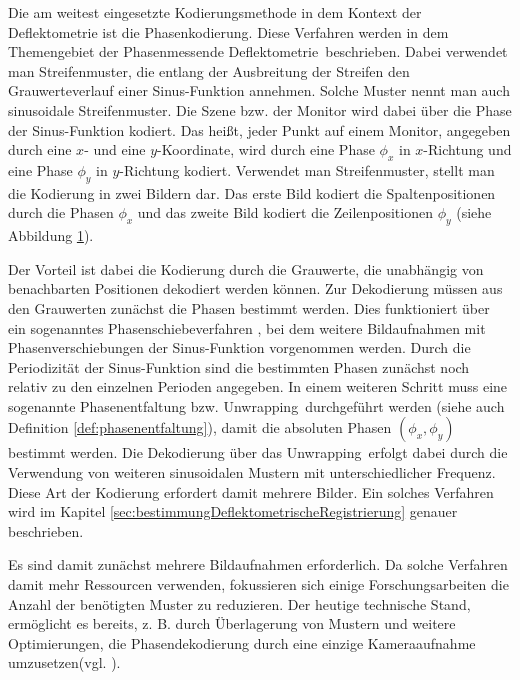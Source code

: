 Die am weitest eingesetzte Kodierungsmethode in dem Kontext der Deflektometrie ist die Phasenkodierung.
Diese Verfahren werden in dem Themengebiet der \glqq Phasenmessende Deflektometrie\grqq ~beschrieben.
Dabei verwendet man Streifenmuster, die entlang der Ausbreitung der Streifen den Grauwerteverlauf einer Sinus-Funktion annehmen.
Solche Muster nennt man auch sinusoidale Streifenmuster.
Die Szene bzw. der Monitor wird dabei über die Phase der Sinus-Funktion kodiert.
Das heißt, jeder Punkt auf einem Monitor, angegeben durch eine $x$- und eine $y$-Koordinate, wird durch eine Phase $\phi_x$ in $x$-Richtung und eine Phase $\phi_y$ in $y$-Richtung kodiert.
Verwendet man Streifenmuster, stellt man die Kodierung in zwei Bildern dar.
Das erste Bild kodiert die Spaltenpositionen durch die Phasen $\phi_x$ und das zweite Bild kodiert die Zeilenpositionen $\phi_y$ (siehe Abbildung \ref{tikz:abbSinusoidaleStreifenmuster}).

\begin{figure}[H]
	\centering
		
		\label{tikz:abbSinusoidaleStreifenmuster}
\end{figure}

\noindent
Der Vorteil ist dabei die Kodierung durch die Grauwerte, die unabhängig von benachbarten Positionen dekodiert werden können.
Zur Dekodierung müssen aus den Grauwerten zunächst die Phasen bestimmt werden.
Dies funktioniert über ein sogenanntes Phasenschiebeverfahren \cite{carre}, bei dem weitere Bildaufnahmen mit Phasenverschiebungen der Sinus-Funktion vorgenommen werden.
Durch die Periodizität der Sinus-Funktion sind die bestimmten Phasen zunächst noch relativ zu den einzelnen Perioden angegeben.
In einem weiteren Schritt muss eine sogenannte Phasenentfaltung bzw. \glqq Unwrapping\grqq ~durchgeführt werden (siehe auch Definition \ref{def:phasenentfaltung}), damit die absoluten Phasen $\left(\phi_x,\phi_y\right)$ bestimmt werden.
Die Dekodierung über das \glqq Unwrapping\grqq ~erfolgt dabei durch die Verwendung von weiteren sinusoidalen Mustern mit unterschiedlicher Frequenz.
Diese Art der Kodierung erfordert damit mehrere Bilder.
Ein solches Verfahren wird im Kapitel \ref{sec:bestimmungDeflektometrischeRegistrierung} genauer beschrieben.

\p
Es sind damit zunächst mehrere Bildaufnahmen erforderlich.
Da solche Verfahren damit mehr Ressourcen verwenden, fokussieren sich einige Forschungsarbeiten die Anzahl der benötigten Muster zu reduzieren.
Der heutige technische Stand, ermöglicht es bereits, z. B. durch Überlagerung von Mustern und weitere Optimierungen, die Phasendekodierung durch eine einzige Kameraaufnahme umzusetzen(vgl. \cite{waveletPMD}).